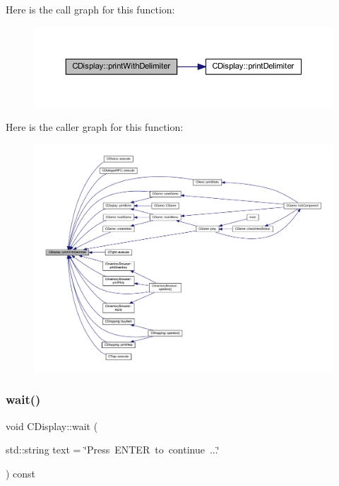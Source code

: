 Here is the call graph for this function\+:\nopagebreak
\begin{figure}[H]
\begin{center}
\leavevmode
\includegraphics[width=350pt]{class_c_display_a53b65673a9b0bfc807a3a1e448962928_cgraph}
\end{center}
\end{figure}
Here is the caller graph for this function\+:\nopagebreak
\begin{figure}[H]
\begin{center}
\leavevmode
\includegraphics[width=350pt]{class_c_display_a53b65673a9b0bfc807a3a1e448962928_icgraph}
\end{center}
\end{figure}
\mbox{\label{class_c_display_a3af2fc29db30feeabc68ffea6fb8c13a}} 
\subsubsection{\texorpdfstring{wait()}{wait()}}
{\footnotesize\ttfamily void C\+Display\+::wait (\begin{DoxyParamCaption}\item[{std\+::string}]{text = {\ttfamily \char`\"{}Press~ENTER~to~continue~...\char`\"{}} }\end{DoxyParamCaption}) const}

